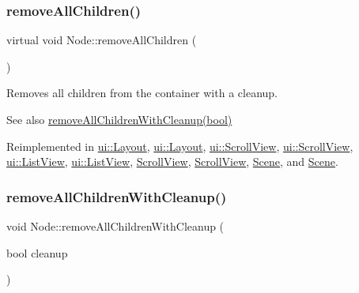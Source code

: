 \mbox{\label{classNode_a4018ec946225eb3bc64a0bbd19cd4625}} 
\subsubsection{\texorpdfstring{remove\+All\+Children()}{removeAllChildren()}\hspace{0.1cm}{\footnotesize\ttfamily [2/2]}}
{\footnotesize\ttfamily virtual void Node\+::remove\+All\+Children (\begin{DoxyParamCaption}{ }\end{DoxyParamCaption})\hspace{0.3cm}{\ttfamily [virtual]}}

Removes all children from the container with a cleanup.

\begin{DoxySeeAlso}{See also}
{\ttfamily \hyperlink{classNode_aca66e2b385c3dbf1a6f55627c4a13192}{remove\+All\+Children\+With\+Cleanup(bool)}} 
\end{DoxySeeAlso}


Reimplemented in \hyperlink{classui_1_1Layout_ace8bad280eb1b1df51211cca73131530}{ui\+::\+Layout}, \hyperlink{classui_1_1Layout_a6b40fa4ad7a14a1eece297e466e2c86e}{ui\+::\+Layout}, \hyperlink{classui_1_1ScrollView_aa036ed1712c78c6ee701eb94eea55091}{ui\+::\+Scroll\+View}, \hyperlink{classui_1_1ScrollView_aaef2d3ce7b1b7d485af4a3657bea17e5}{ui\+::\+Scroll\+View}, \hyperlink{classui_1_1ListView_acfa88e95692c1e9713697fbd2754379b}{ui\+::\+List\+View}, \hyperlink{classui_1_1ListView_a7e534825fe60406ed544a254b0975489}{ui\+::\+List\+View}, \hyperlink{classScrollView_a6a3b9ea8f88bca7ad741b511de369f24}{Scroll\+View}, \hyperlink{classScrollView_aaef2d3ce7b1b7d485af4a3657bea17e5}{Scroll\+View}, \hyperlink{classScene_af55bdd0731d6ccfdd1c95c4011451adb}{Scene}, and \hyperlink{classScene_a7e54f25b14b057ab896b0ef3262cef86}{Scene}.

\mbox{\label{classNode_aca66e2b385c3dbf1a6f55627c4a13192}} 
\subsubsection{\texorpdfstring{remove\+All\+Children\+With\+Cleanup()}{removeAllChildrenWithCleanup()}\hspace{0.1cm}{\footnotesize\ttfamily [1/2]}}
{\footnotesize\ttfamily void Node\+::remove\+All\+Children\+With\+Cleanup (\begin{DoxyParamCaption}\item[{bool}]{cleanup }\end{DoxyParamCaption})\hspace{0.3cm}{\ttfamily [virtual]}}

